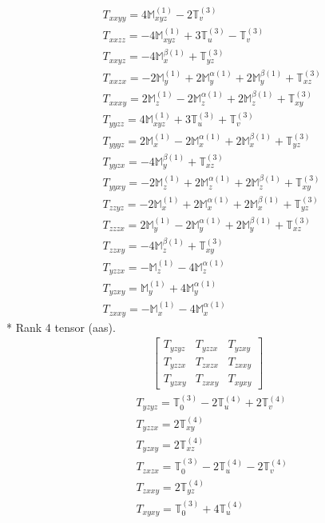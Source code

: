\documentclass[fleqn,8pt,landscape]{jsarticle}
\begin{document}
\begin{align*}
& T_{xxyy} = 4 \mathbb{M}_{xyz}^{(1)} - 2 \mathbb{T}_{v}^{(3)} \\
& T_{xxzz} = - 4 \mathbb{M}_{xyz}^{(1)} + 3 \mathbb{T}_{u}^{(3)} - \mathbb{T}_{v}^{(3)} \\
& T_{xxyz} = - 4 \mathbb{M}_{x}^{\beta(1)} + \mathbb{T}_{yz}^{(3)} \\
& T_{xxzx} = - 2 \mathbb{M}_{y}^{(1)} + 2 \mathbb{M}_{y}^{\alpha(1)} + 2 \mathbb{M}_{y}^{\beta(1)} + \mathbb{T}_{xz}^{(3)} \\
& T_{xxxy} = 2 \mathbb{M}_{z}^{(1)} - 2 \mathbb{M}_{z}^{\alpha(1)} + 2 \mathbb{M}_{z}^{\beta(1)} + \mathbb{T}_{xy}^{(3)} \\
& T_{yyzz} = 4 \mathbb{M}_{xyz}^{(1)} + 3 \mathbb{T}_{u}^{(3)} + \mathbb{T}_{v}^{(3)} \\
& T_{yyyz} = 2 \mathbb{M}_{x}^{(1)} - 2 \mathbb{M}_{x}^{\alpha(1)} + 2 \mathbb{M}_{x}^{\beta(1)} + \mathbb{T}_{yz}^{(3)} \\
& T_{yyzx} = - 4 \mathbb{M}_{y}^{\beta(1)} + \mathbb{T}_{xz}^{(3)} \\
& T_{yyxy} = - 2 \mathbb{M}_{z}^{(1)} + 2 \mathbb{M}_{z}^{\alpha(1)} + 2 \mathbb{M}_{z}^{\beta(1)} + \mathbb{T}_{xy}^{(3)} \\
& T_{zzyz} = - 2 \mathbb{M}_{x}^{(1)} + 2 \mathbb{M}_{x}^{\alpha(1)} + 2 \mathbb{M}_{x}^{\beta(1)} + \mathbb{T}_{yz}^{(3)} \\
& T_{zzzx} = 2 \mathbb{M}_{y}^{(1)} - 2 \mathbb{M}_{y}^{\alpha(1)} + 2 \mathbb{M}_{y}^{\beta(1)} + \mathbb{T}_{xz}^{(3)} \\
& T_{zzxy} = - 4 \mathbb{M}_{z}^{\beta(1)} + \mathbb{T}_{xy}^{(3)} \\
& T_{yzzx} = - \mathbb{M}_{z}^{(1)} - 4 \mathbb{M}_{z}^{\alpha(1)} \\
& T_{yzxy} = \mathbb{M}_{y}^{(1)} + 4 \mathbb{M}_{y}^{\alpha(1)} \\
& T_{zxxy} = - \mathbb{M}_{x}^{(1)} - 4 \mathbb{M}_{x}^{\alpha(1)}
\end{align*}
* Rank 4 tensor (aas).
\begin{align*}
\begin{bmatrix} T_{yzyz} & T_{yzzx} & T_{yzxy} \\ T_{yzzx} & T_{zxzx} & T_{zxxy} \\ T_{yzxy} & T_{zxxy} & T_{xyxy} \end{bmatrix}
\end{align*}
\begin{align*}
& T_{yzyz} = \mathbb{T}_{0}^{(3)} - 2 \mathbb{T}_{u}^{(4)} + 2 \mathbb{T}_{v}^{(4)} \\
& T_{yzzx} = 2 \mathbb{T}_{xy}^{(4)} \\
& T_{yzxy} = 2 \mathbb{T}_{xz}^{(4)} \\
& T_{zxzx} = \mathbb{T}_{0}^{(3)} - 2 \mathbb{T}_{u}^{(4)} - 2 \mathbb{T}_{v}^{(4)} \\
& T_{zxxy} = 2 \mathbb{T}_{yz}^{(4)} \\
& T_{xyxy} = \mathbb{T}_{0}^{(3)} + 4 \mathbb{T}_{u}^{(4)}
\end{align*}
\end{document}

